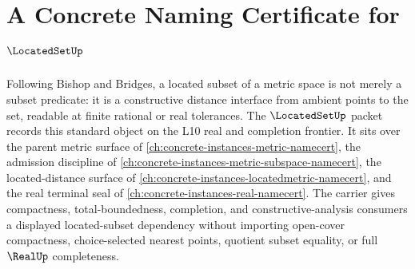 \chapter{A Concrete Naming Certificate for $\LocatedSetUp$}
\label{ch:concrete-instances-locatedset-namecert}

Following Bishop and Bridges, a located subset of a metric space is not merely a subset predicate: it is a constructive distance interface from ambient points to the set, readable at finite rational or real tolerances. The $\LocatedSetUp$ packet records this standard object on the L10 real and completion frontier. It sits over the parent metric surface of \autoref{ch:concrete-instances-metric-namecert}, the admission discipline of \autoref{ch:concrete-instances-metric-subspace-namecert}, the located-distance surface of \autoref{ch:concrete-instances-locatedmetric-namecert}, and the real terminal seal of \autoref{ch:concrete-instances-real-namecert}. The carrier gives compactness, total-boundedness, completion, and constructive-analysis consumers a displayed located-subset dependency without importing open-cover compactness, choice-selected nearest points, quotient subset equality, or full $\RealUp$ completeness.

